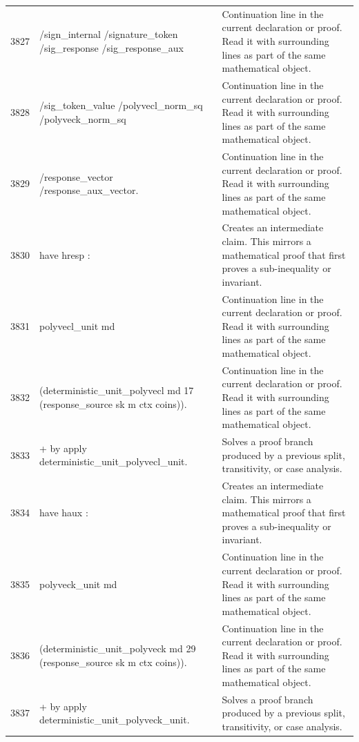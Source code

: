 \documentclass[10pt]{article}
\begin{document}
\begin{longtable}{r L{0.53\textwidth} L{0.37\textwidth}}
3827 & {\ttfamily\scriptsize         /sign\_internal /signature\_token /sig\_response /sig\_response\_aux} & Continuation line in the current declaration or proof.  Read it with surrounding lines as part of the same mathematical object. \\
3828 & {\ttfamily\scriptsize         /sig\_token\_value /polyvecl\_norm\_sq /polyveck\_norm\_sq} & Continuation line in the current declaration or proof.  Read it with surrounding lines as part of the same mathematical object. \\
3829 & {\ttfamily\scriptsize         /response\_vector /response\_aux\_vector.} & Continuation line in the current declaration or proof.  Read it with surrounding lines as part of the same mathematical object. \\
3830 & {\ttfamily\scriptsize have hresp :} & Creates an intermediate claim.  This mirrors a mathematical proof that first proves a sub-inequality or invariant. \\
3831 & {\ttfamily\scriptsize   polyvecl\_unit md} & Continuation line in the current declaration or proof.  Read it with surrounding lines as part of the same mathematical object. \\
3832 & {\ttfamily\scriptsize     (deterministic\_unit\_polyvecl md 17 (response\_source sk m ctx coins)).} & Continuation line in the current declaration or proof.  Read it with surrounding lines as part of the same mathematical object. \\
3833 & {\ttfamily\scriptsize + by apply deterministic\_unit\_polyvecl\_unit.} & Solves a proof branch produced by a previous split, transitivity, or case analysis. \\
3834 & {\ttfamily\scriptsize have haux :} & Creates an intermediate claim.  This mirrors a mathematical proof that first proves a sub-inequality or invariant. \\
3835 & {\ttfamily\scriptsize   polyveck\_unit md} & Continuation line in the current declaration or proof.  Read it with surrounding lines as part of the same mathematical object. \\
3836 & {\ttfamily\scriptsize     (deterministic\_unit\_polyveck md 29 (response\_source sk m ctx coins)).} & Continuation line in the current declaration or proof.  Read it with surrounding lines as part of the same mathematical object. \\
3837 & {\ttfamily\scriptsize + by apply deterministic\_unit\_polyveck\_unit.} & Solves a proof branch produced by a previous split, transitivity, or case analysis. \\

\end{longtable}
\end{document}
